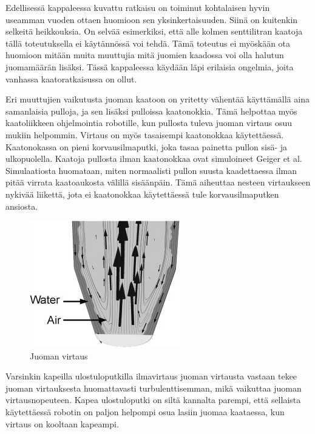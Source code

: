 Edellisessä kappaleessa kuvattu ratkaisu on toiminut kohtalaisen hyvin useamman vuoden ottaen huomioon sen yksinkertaisuuden. Siinä on kuitenkin selkeitä heikkouksia. On selvää esimerkiksi, että alle kolmen senttilitran kaatoja tällä toteutuksella ei käytännössä voi tehdä. Tämä toteutus ei myöskään ota huomioon mitään muita muuttujia mitä juomien kaadossa voi olla halutun juomamäärän lisäksi. Tässä kappaleessa käydään läpi erilaisia ongelmia, joita vanhassa kaatoratkaisussa on ollut.

Eri muuttujien vaikutusta juoman kaatoon on yritetty vähentää käyttämällä aina samanlaisia pulloja, ja sen lisäksi pulloissa kaatonokkia. Tämä helpottaa myös kaatoliikkeen ohjelmointia robotille, kun pullosta tuleva juoman virtaus osuu mukiin helpommin. Virtaus on myös tasaisempi kaatonokkaa käytettäessä. Kaatonokassa on pieni korvausilmaputki, joka tasaa painetta pullon sisä- ja ulkopuolella. Kaatoja pullosta ilman kaatonokkaa ovat simuloineet Geiger et al. Simulaatiosta huomataan, miten normaalisti pullon suusta kaadettaessa ilman pitää virrata kaatoaukosta välillä sisäänpäin. Tämä aiheuttaa nesteen virtaukseen nykivää liikettä, jota ei kaatonokkaa käytettäessä tule korvausilmaputken ansiosta.


\begin{figure}[h]
\begin{center}
\includegraphics[scale=1.1]{img/Geiger et al. juoman virtaus.jpg}
\end{center}
\caption{Juoman virtaus \cite{Geiger2012}}
\label{fig:juomien_virtaus}
\end{figure}

Varsinkin kapeilla ulostuloputkilla ilmavirtaus juoman virtausta vastaan tekee juoman virtauksesta huomattavasti turbulenttisemman, mikä vaikuttaa juoman virtausnopeuteen. \cite{Geiger2012} Kapea ulostuloputki on siltä kannalta parempi, että sellaista käytettäessä robotin on paljon helpompi osua lasiin juomaa kaataessa, kun virtaus on kooltaan kapeampi.


